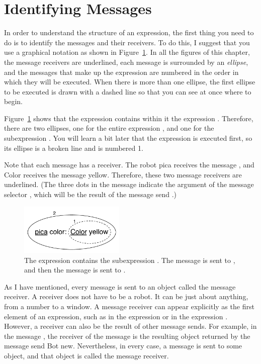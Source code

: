 \documentclass[a4paper,10pt,twoside]{book}
\begin{document}
\section{Identifying Messages}

In order to understand the structure of an expression, the first thing you need to do is to identify 
the messages and their receivers. To do this, I suggest that you use a graphical notation as shown 
in Figure~\ref{fig:uKeyUnOne}. In all the figures of this chapter, the message receivers are underlined, each 
message is surrounded by an \emph{ellipse}, and the messages that make up the expression are numbered in 
the order in which they will be executed. When there is more than one ellipse, the first ellipse to 
be executed is drawn with a dashed line so that you can see at once where to begin. 

Figure~\ref{fig:uKeyUnOne}  shows that the expression  contains within it the 
expression . Therefore, there are two ellipses, one for the entire expression , and one for the subexpression . You will learn a bit later that 
the expression  is executed first, so its ellipse is a broken line and is numbered 1. 

Note that each message has a receiver. The robot pica receives the message , and 
Color receives the message yellow. Therefore, these two message receivers are underlined. (The 
three dots in the message  indicate the argument of the message selector , 
which will be the result of the message send .) 

 \begin{figure}[h]
 	\centerline{\includegraphics[width=5cm]{uKeyUnOne}}
 	\caption{The expression  contains the subexpression . 
	The message  is sent to , and then the message  is sent to .  
 	\label{fig:uKeyUnOne}}
 \end{figure}

As I have mentioned, every message is sent to an object called the message receiver. A 
receiver does not have to be a robot. It can be just about anything, from a number to a window. A message receiver can appear explicitly as the first element of an expression, such as 
 in the expression  or  in the expression . However, a receiver 
can also be the result of other message sends. For example, in the message , 
the receiver of the message  is the resulting object returned by the message send Bot 
new. Nevertheless, in every case, a message is sent to some object, and that object is called the 
message receiver. 
\end{document}
